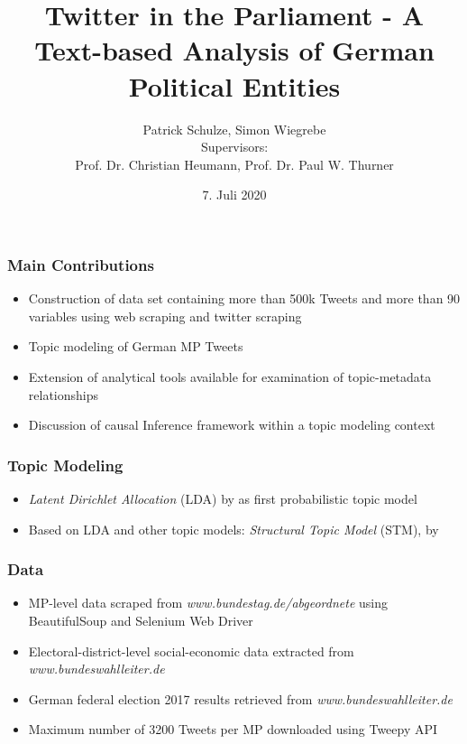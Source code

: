 \documentclass[xcolor=dvipsnames]{beamer}
\title{Twitter in the Parliament - A Text-based Analysis of German Political Entities}
\date{7. Juli 2020}
\author[author1]{Patrick Schulze, Simon Wiegrebe\\[10mm]{\small Supervisors:\\ Prof. Dr. Christian Heumann, Prof. Dr. Paul W. Thurner}}
\begin{document}
\begin{frame}
\titlepage
\end{frame}


\section{}
\begin{frame}
\frametitle{Main Contributions}
\begin{itemize}
\item Construction of data set containing more than 500k Tweets and more than 90 variables using web scraping and twitter scraping
\item Topic modeling of German MP Tweets
\item Extension of analytical tools available for examination of topic-metadata relationships 
\item Discussion of causal Inference framework within a topic modeling context
\end{itemize}
\end{frame}

\begin{frame}
\frametitle{Topic Modeling}
\begin{itemize}
\item \textit{Latent Dirichlet Allocation} (LDA) by \textcite{blei2003latent} as first probabilistic topic model
\item Based on LDA and other topic models: \textit{Structural Topic Model} (STM), by \textcite{roberts2016model}
\end{itemize}
\end{frame}

\begin{frame}
\frametitle{Data}
\begin{itemize}
\item MP-level data scraped from \textit{www.bundestag.de/abgeordnete} using BeautifulSoup and Selenium Web Driver
\item Electoral-district-level social-economic data extracted from \textit{www.bundeswahlleiter.de}
\item German federal election 2017 results retrieved from \textit{www.bundeswahlleiter.de}
\item Maximum number of 3200 Tweets per MP downloaded using Tweepy API 
\end{itemize}
\end{frame}
\end{document}
